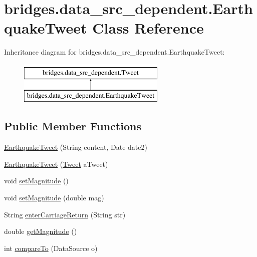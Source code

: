 \hypertarget{classbridges_1_1data__src__dependent_1_1_earthquake_tweet}{}\section{bridges.\+data\+\_\+src\+\_\+dependent.\+Earthquake\+Tweet Class Reference}
\label{classbridges_1_1data__src__dependent_1_1_earthquake_tweet}
Inheritance diagram for bridges.\+data\+\_\+src\+\_\+dependent.\+Earthquake\+Tweet\+:\begin{figure}[H]
\begin{center}
\leavevmode
\includegraphics[height=2.000000cm]{classbridges_1_1data__src__dependent_1_1_earthquake_tweet}
\end{center}
\end{figure}
\subsection*{Public Member Functions}
\begin{DoxyCompactItemize}
\item 
\mbox{\hyperlink{classbridges_1_1data__src__dependent_1_1_earthquake_tweet_a1f2d4634e85c75c59ba9d4aec878db54}{Earthquake\+Tweet}} (String content, Date date2)
\item 
\mbox{\hyperlink{classbridges_1_1data__src__dependent_1_1_earthquake_tweet_af0a8e9201997a7d4805f11c02f197410}{Earthquake\+Tweet}} (\mbox{\hyperlink{classbridges_1_1data__src__dependent_1_1_tweet}{Tweet}} a\+Tweet)
\item 
void \mbox{\hyperlink{classbridges_1_1data__src__dependent_1_1_earthquake_tweet_a49880f314eee430098ca347cd07ff470}{set\+Magnitude}} ()
\item 
void \mbox{\hyperlink{classbridges_1_1data__src__dependent_1_1_earthquake_tweet_a763d8a261a563e66af95c5a97850ecc0}{set\+Magnitude}} (double mag)
\item 
String \mbox{\hyperlink{classbridges_1_1data__src__dependent_1_1_earthquake_tweet_a3e39d6fa01f24cb259d32bb39108feb1}{enter\+Carriage\+Return}} (String str)
\item 
double \mbox{\hyperlink{classbridges_1_1data__src__dependent_1_1_earthquake_tweet_a8f3d92b4e60b922e996ecfaee3c5260e}{get\+Magnitude}} ()
\item 
int \mbox{\hyperlink{classbridges_1_1data__src__dependent_1_1_earthquake_tweet_a6b4de2a600b93ed96f6cde8b719ea645}{compare\+To}} (Data\+Source o)
\end{DoxyCompactItemize}


